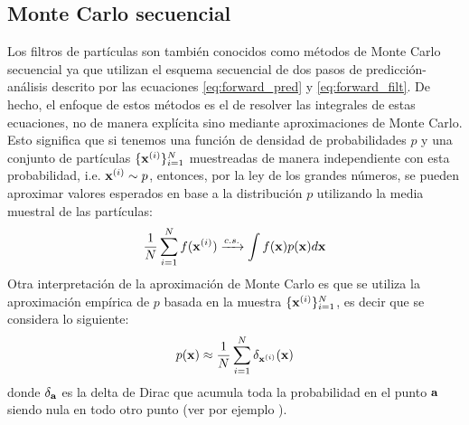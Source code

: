 \subsection{Monte Carlo secuencial}


Los filtros de partículas son también conocidos como métodos de Monte Carlo secuencial ya que utilizan el esquema secuencial de dos pasos de predicción-análisis descrito por las ecuaciones \ref{eq:forward_pred} y \ref{eq:forward_filt}. De hecho, el enfoque de estos métodos es el de resolver las integrales de estas ecuaciones, no de manera explícita sino mediante aproximaciones de Monte Carlo. Esto significa que si tenemos una función de densidad de probabilidades $p$ y una conjunto de partículas $\{\mathbf{x}^{(i)}\}_{i=1}^N$ muestreadas de manera independiente con esta probabilidad, i.e. $\mathbf{x}^{(i)}\sim p$, entonces, por la ley de los grandes números, se pueden aproximar valores esperados en base a la distribución $p$ utilizando la media muestral de las partículas:
\begin{align*}
    \frac{1}{N}\sum_{i=1}^N f(\mathbf{x}^{(i)}) \xrightarrow{c. s.} \int f(\mathbf{x}) p(\mathbf{x}) d \mathbf{x}
\end{align*}
Otra interpretación de la aproximación de Monte Carlo es que se utiliza la aproximación empírica de $p$ basada en la muestra $\{\mathbf{x}^{(i)}\}_{i=1}^N$, es decir que se considera lo siguiente:
\begin{align*}
    p(\mathbf{x}) \approx \frac{1}{N}\sum_{i=1}^N \delta_{\mathbf{x}^{(i)}}(\mathbf{x})
\end{align*}
donde $\delta_{\mathbf{a}}$ es la delta de Dirac que acumula toda la probabilidad en el punto $\mathbf{a}$ siendo nula en todo otro punto (ver por ejemplo \cite{Doucet2001}).

